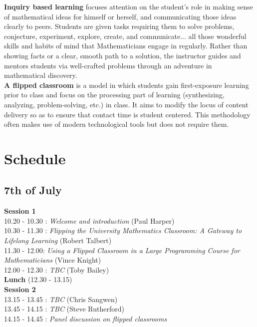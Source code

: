 \documentclass {leaflet}
\begin{document}
\vspace{1cm}

\textbf{Inquiry based learning} focuses attention on the student's role in making sense of mathematical ideas for himself or herself, and communicating those ideas clearly to peers. Students are given tasks requiring them to solve problems, conjecture, experiment, explore, create, and communicate... all those wonderful skills and habits of mind that Mathematicians engage in regularly. Rather than showing facts or a clear, smooth path to a solution, the instructor guides and mentors students via well-crafted problems through an adventure in mathematical discovery.\\

\vspace{1cm}
\textbf{A flipped classroom} is a model in which students gain first-exposure learning prior to class and focus on the processing part of learning (synthesizing, analyzing, problem-solving, etc.) in class. It aims to modify the locus of content delivery so as to ensure that contact time is student centered. This methodology often makes use of modern technological tools but does not require them.

\newpage
\section{Schedule}
\subsection{7th of July}
\vspace{1cm}

\textbf{Session 1}\\

10.20 - 10.30 : \textit{Welcome and introduction} (Paul Harper)\\
10.30 - 11.30 : \textit{Flipping the University Mathematics Classroom: A Gateway to Lifelong Learning} (Robert Talbert)\\
11.30 - 12.00: \textit{Using a Flipped Classroom in a Large Programming Course for Mathematicians} (Vince Knight)\\
12.00 - 12.30 : \textit{TBC} (Toby Bailey)\\

\textbf{Lunch} (12.30 - 13.15)\\

\textbf{Session 2}\\

13.15 - 13.45 : \textit{TBC} (Chris Sangwen)\\
13.45 - 14.15 : \textit{TBC} (Steve Rutherford)\\
14.15 - 14.45 : \textit{Panel discussion on flipped classrooms}\\
\end{document}
